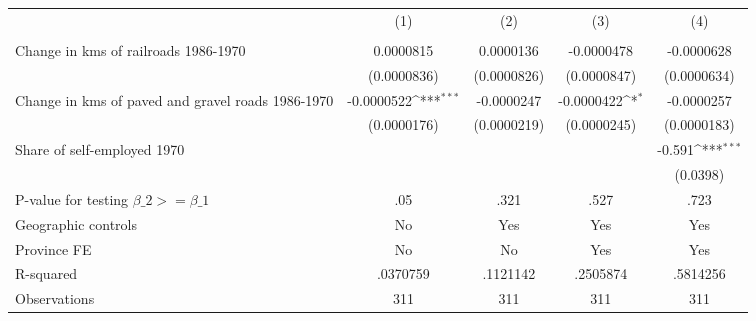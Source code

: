 {
\def\sym#1{\ifmmode^{#1}\else\(^{#1}\)\fi}
\begin{tabular}{l*{4}{c}}
\hline\hline
                &\multicolumn{1}{c}{(1)}&\multicolumn{1}{c}{(2)}&\multicolumn{1}{c}{(3)}&\multicolumn{1}{c}{(4)}\\
                &\multicolumn{1}{c}{}&\multicolumn{1}{c}{}&\multicolumn{1}{c}{}&\multicolumn{1}{c}{}\\
\hline
Change in kms of railroads 1986-1970&0.0000815         &0.0000136         &-0.0000478         &-0.0000628         \\
                &(0.0000836)         &(0.0000826)         &(0.0000847)         &(0.0000634)         \\
[1em]
Change in kms of paved and gravel roads 1986-1970&-0.0000522\sym{***}&-0.0000247         &-0.0000422\sym{*}  &-0.0000257         \\
                &(0.0000176)         &(0.0000219)         &(0.0000245)         &(0.0000183)         \\
[1em]
Share of self-employed 1970&                  &                  &                  &   -0.591\sym{***}\\
                &                  &                  &                  & (0.0398)         \\
\hline
P-value for testing $\beta\_{2} >= \beta\_{1}$&      .05         &     .321         &     .527         &     .723         \\
Geographic controls&       No         &      Yes         &      Yes         &      Yes         \\
Province FE     &       No         &       No         &      Yes         &      Yes         \\
R-squared       & .0370759         & .1121142         & .2505874         & .5814256         \\
Observations    &      311         &      311         &      311         &      311         \\
\hline\hline
\end{tabular}
}
